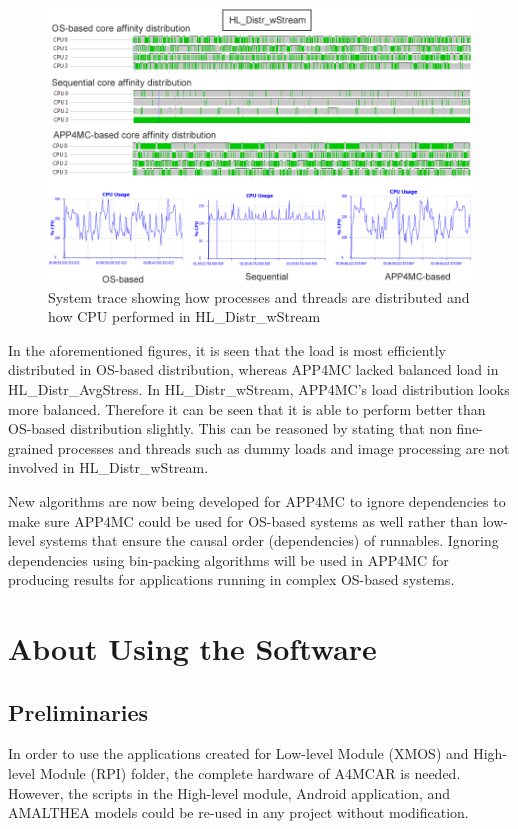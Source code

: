 \begin{figure}[!ht]
	\centering
	\includegraphics[width=\textwidth]{content/images/traceswStream.png}
	\caption{System trace showing how processes and threads are distributed and how CPU performed in HL{\_}Distr{\_}wStream}
	\label{fig:traceswStream}
\end{figure}

In the aforementioned figures, it is seen that the load is most efficiently distributed in OS-based distribution, whereas APP4MC lacked balanced load in HL{\_}Distr{\_}AvgStress. In HL{\_}Distr{\_}wStream, APP4MC's load distribution looks more balanced. Therefore it can be seen that it is able to perform better than OS-based distribution slightly. This can be reasoned by stating that non fine-grained processes and threads such as dummy loads and image processing are not involved in HL{\_}Distr{\_}wStream. 

New algorithms are now being developed for APP4MC to ignore dependencies to make sure APP4MC could be used for OS-based systems as well rather than low-level systems that ensure the causal order (dependencies) of runnables. Ignoring dependencies using bin-packing algorithms \cite{binpacking} will be used in APP4MC for producing results for applications running in complex OS-based systems.

\newpage

\section{About Using the Software}
\subsection{Preliminaries}
In order to use the applications created for Low-level Module (XMOS) and High-level Module (RPI) folder, the complete hardware of A4MCAR is needed. However, the scripts in the High-level module, Android application, and AMALTHEA models could be re-used in any project without modification.
